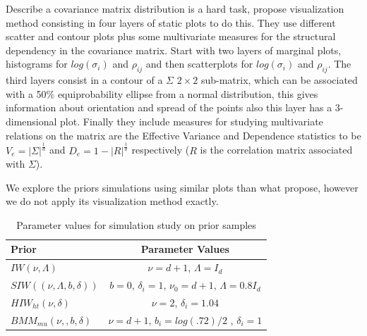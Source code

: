 \documentclass{article}
\begin{document}
Describe a covariance matrix distribution is a hard task, \cite{visualize} propose visualization method consisting in four layers of static plots to do this. They use different scatter and contour plots plus some multivariate measures for the structural dependency in the covariance matrix. Start with two layers of marginal plots, histograms for $log(\sigma_i)$ and $\rho_{ij}$ and then scatterplots for $log(\sigma_i)$ and $\rho_{ij}$. The third layers consist in a contour of a $\Sigma$ $2\times2$ sub-matrix, which can be associated with a 50\% equiprobability ellipse from a normal distribution, this gives information about orientation and spread of the points also this layer has a 3-dimensional plot. Finally they include measures for studying multivariate relations on the matrix are the Effective Variance and Dependence statistics to be $V_e = |\Sigma|^{\frac{1}{d}}$ and $D_e=1-|R|^{\frac{1}{d}}$ respectively ($R$ is the correlation matrix associated with $\Sigma$). 

We explore the priors simulations using similar plots than what \cite{visualize} propose, however we do not apply its visualization method exactly.  

\begin{table}[htbp]
   \centering
    \caption{ Parameter values for simulation study on prior samples}
   \label{paramvals} 
   \begin{tabular}{ l|c}
   \hline
      Prior    &  Parameter Values \\ \hline
  $IW(\nu, \Lambda)$ &   $\nu=d+1$, $\Lambda=I_d$ \\ 
  $SIW((\nu, \Lambda, b, \delta))$  & $b=0$, $\delta_i =1$,  $\nu_0= d + 1$, $\Lambda = 0.8I_d$ \\
  $HIW_{ht}(\nu, \delta)$    &  $\nu=2$,  $\delta_i=1.04$ \\
   $BMM_{mu}(\nu,,b,\delta)$   &  $\nu=d+1$, $b_i=log(.72)/2$ , $\delta_i=1$ \\ \hline
   \end{tabular}
 \end{table}       
\end{document}
